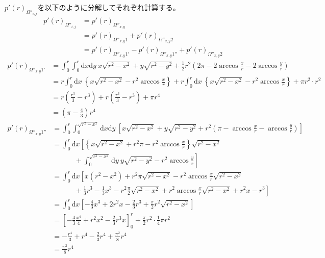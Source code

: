 $p'(r)_{\Omega''_{i,j}}$を以下のように分解してそれぞれ計算する。
\begin{align}
p'(r)_{\Omega''_{i,j}} &= p'(r)_{\Omega''_{x, y}}\nonumber \\
&= p'(r)_{\Omega''_{x, y}1}  +p'(r)_{\Omega''_{x, y}2}\nonumber \\
&= p'(r)_{\Omega''_{x, y}1'} - p'(r)_{\Omega''_{x, y}1''} + p'(r)_{\Omega''_{x, y}2}
\end{align}
\begin{align}
p'(r)_{\Omega''_{x,y}1'} &= \int^{r}_{0}\int^{r}_{0}\mathrm{d}x\mathrm{d}y\ x\sqrt{r^{2}-x^{2}} + y \sqrt{r^{2} -y^{2}} + \frac{1}{2}r^{2}\left( 2\pi -2\arccos\frac{x}{r} -2\arccos\frac{y}{r} \right) \nonumber \\
&= r\int^{r}_{0}\mathrm{d}x\ \left\{x\sqrt{r^{2}-x^{2}} - r^{2}\arccos\frac{x}{r} \right\} + r\int^{r}_{0}\mathrm{d}x\ \left\{x\sqrt{r^{2}-x^{2}} - r^{2}\arccos\frac{x}{r} \right\} + \pi r^{2}\cdot r^{2}\nonumber \\
&= r\left( \frac{r^{3}}{3} -r^{3} \right) + r\left( \frac{r^{3}}{3} -r^{3} \right) + \pi r^{4}\nonumber \\
&=  \left(\pi -\frac{4}{3}\right)r^{4}
\end{align}
\begin{align}
p'(r)_{\Omega''_{x,y}1''} &= \int^{r}_{0}\int^{\sqrt{r^{2}-x^{2}}}_{0}\mathrm{d}x\mathrm{d}y\ \left[ x\sqrt{r^{2}-x^{2}} + y \sqrt{r^{2} -y^{2}} + r^{2}\left(\pi -\arccos\frac{x}{r} -\arccos\frac{y}{r}\right) \right]\nonumber \\
&= \int^{r}_{0}\mathrm{d}x\left[ \left\{ x\sqrt{r^{2}-x^{2}} + r^{2}\pi -r^{2}\arccos\frac{x}{r} \right\}\sqrt{r^{2}-x^{2}} \right. \nonumber\\
&\ \ \ \ \ \ \ \ \ \ \ \ \ \ + \left. \int^{\sqrt{r^{2}-x^{2}}}_{0}\mathrm{d}y\ y\sqrt{r^{2}-y^{2}} -r^{2}\arccos\frac{y}{r}\right]\nonumber \\
&= \int^{r}_{0}\mathrm{d}x\left[ x(r^{2}-x^{2}) + r^{2}\pi\sqrt{r^{2}-x^{2}} -r^{2}\arccos \frac{x}{r} \sqrt{r^{2}-x^{2}} \right. \nonumber \\
&\ \ \ \ \ \ \ \ \ \ \ \ \ \ + \left. \frac{1}{3}r^{3} - \frac{1}{3}x^{3} - r^{2}\frac{\pi}{2}\sqrt{r^{2}-x^{2}} + r^{2}\arccos\frac{x}{r}\sqrt{r^{2}-x^{2}} +r^{2}x - r^{3}\right] \nonumber \\
&= \int^{r}_{0}\mathrm{d}x \left[-\frac{4}{3}x^{3} + 2r^{2}x - \frac{2}{3}r^{3} + \frac{\pi}{2}r^{2}\sqrt{r^{2}-x^{2}} \right]\nonumber \\
&= \left[ -\frac{4}{3}\frac{x^{4}}{4} + r^{2}x^{2} - \frac{2}{3}r^{3}x \right]^{r}_{0} + \frac{\pi}{2}r^{2}\cdot \frac{1}{4}\pi r^{2}\nonumber \\
&= -\frac{r^{4}}{3} + r^{4} -\frac{2}{3}r^{4} + \frac{\pi ^{2}}{8}r^{4}\nonumber \\
&= \frac{\pi^{2}}{8}r^{4}
\end{align}

